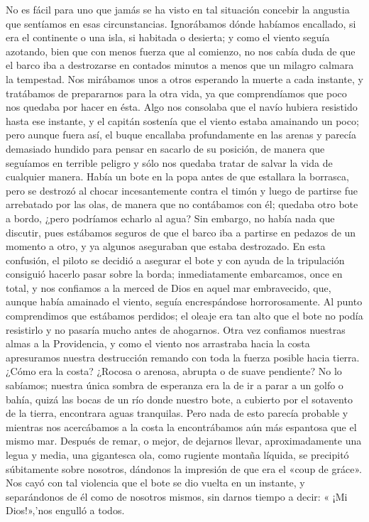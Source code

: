 \documentclass{novela}
\begin{document}
    No es fácil para uno que jamás se ha visto en tal situación concebir la angustia que sentíamos en esas circunstancias. Ignorábamos dónde habíamos encallado, si era el continente o una isla, si habitada o desierta; y como el viento seguía azotando, bien que con menos fuerza que al comienzo, no nos cabía duda de que el barco iba a destrozarse en contados minutos a menos que un milagro calmara la tempestad. Nos mirábamos unos a otros esperando la muerte a cada instante, y tratábamos de prepararnos para la otra vida, ya que comprendíamos que poco nos quedaba por hacer en ésta. Algo nos consolaba que el navío hubiera resistido hasta ese instante, y el capitán sostenía que el viento estaba amainando un poco; pero aunque fuera así, el buque encallaba profundamente en las arenas y parecía demasiado hundido para pensar en sacarlo de su posición, de manera que seguíamos en terrible peligro y sólo nos quedaba tratar de salvar la vida de cualquier manera. Había un bote en la popa antes de que estallara la borrasca, pero se destrozó al chocar incesantemente contra el timón y luego de partirse fue arrebatado por las olas, de manera que no contábamos con él; quedaba otro bote a bordo, ¿pero podríamos echarlo al agua? Sin embargo, no había nada que discutir, pues estábamos seguros de que el barco iba a partirse en pedazos de un momento a otro, y ya algunos aseguraban que estaba destrozado.
    En esta confusión, el piloto se decidió a asegurar el bote y con ayuda de la tripulación consiguió hacerlo pasar sobre la borda; inmediatamente embarcamos, once en total, y nos confiamos a la merced de Dios en aquel mar embravecido, que, aunque había amainado el viento, seguía encrespándose horrorosamente.
    Al punto comprendimos que estábamos perdidos; el oleaje era tan alto que el bote no podía resistirlo y no pasaría mucho antes de ahogarnos. Otra vez confiamos nuestras almas a la Providencia, y como el viento nos arrastraba hacia la costa apresuramos nuestra destrucción remando con toda la fuerza posible hacia tierra.
    ¿Cómo era la costa? ¿Rocosa o arenosa, abrupta o de suave pendiente? No lo sabíamos; nuestra única sombra de esperanza era la de ir a parar a un golfo o bahía, quizá las bocas de un río donde nuestro bote, a cubierto por el sotavento de la tierra, encontrara aguas tranquilas. Pero nada de esto parecía probable y mientras nos acercábamos a la costa la encontrábamos aún más espantosa que el mismo mar.
    Después de remar, o mejor, de dejarnos llevar, aproximadamente una legua y media, una gigantesca ola, como rugiente montaña líquida, se precipitó súbitamente sobre nosotros, dándonos la impresión de que era el «coup de gráce». Nos cayó con tal violencia que el bote se dio vuelta en un instante, y separándonos de él como de nosotros mismos, sin darnos tiempo a decir: « ¡Mi Dios!»,'nos engulló a todos.
\end{document}
